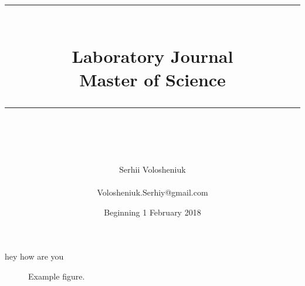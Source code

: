 \documentclass[idxtotoc,hyperref,openany,oneside]{labbook} %
\newcommand{\HRule}{\rule{\linewidth}{0.5mm}} %
\begin{document}

\frontmatter %
\title{
\begin{center}
\HRule \\[0.4cm]
{\Huge \bfseries Laboratory Journal \\[0.5cm] \Large Master of Science}\\[0.4cm] %
\HRule \\[1.5cm]
\end{center}
}
\author{\Huge Serhii Volosheniuk \\ \\ \LARGE Volosheniuk.Serhiy@gmail.com \\[2cm]} %
\date{Beginning 1 February 2018} %
\maketitle

\tableofcontents

\mainmatter %











hey how are you



\begin{figure}[H] %
\begin{center}
\end{center}
\caption{Example figure.}
\label{fig:example_figure}
\end{figure}
\end{document}
